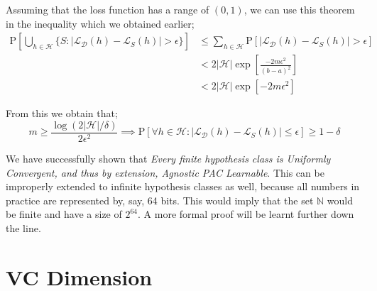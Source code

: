 \documentclass[11pt,oneside,onemany]{book} %
\begin{document}
Assuming that the loss function has a range of $(0,1)$, we can use this theorem in the inequality which we obtained earlier;
\begin{align*}
    \text{P}\left[\bigcup\limits_{h\in\mathcal{H}}\{S:| \mathcal{L}_\mathcal{D}(h) - \mathcal{L}_S(h) | > \epsilon\}\right] &\leq 
    \sum_{h\in\mathcal{H}}\text{P}\left[ |\mathcal{L}_\mathcal{D}(h)-\mathcal{L}_S(h)| > \epsilon \right] \\
    &< 2|\mathcal{H}|\exp\left[ \frac{-2m\epsilon^2}{(b-a)^2} \right]
    \\
    &< 2|\mathcal{H}|\exp\left[ -2m\epsilon^2 \right]
\end{align*}

From this we obtain that;
$$
    m \geq \frac{\log(2|\mathcal{H}|/\delta)}{2\epsilon^2} \implies
    \text{P}\left[\forall h\in\mathcal{H}: |\mathcal{L}_\mathcal{D}(h) - \mathcal{L}_S(h) | \leq \epsilon\right] \geq 1-\delta
$$

We have successfully shown that \emph{Every finite hypothesis class is Uniformly Convergent, and thus by extension, Agnostic PAC Learnable}. This can be improperly extended to infinite hypothesis classes as well, because all numbers in practice are represented by, say, 64 bits. This would imply that the set $\mathbb{N}$ would be finite and have a size of $2^{64}$. A more formal proof will be learnt further down the line.

\chapter{VC Dimension}


\end{document}

